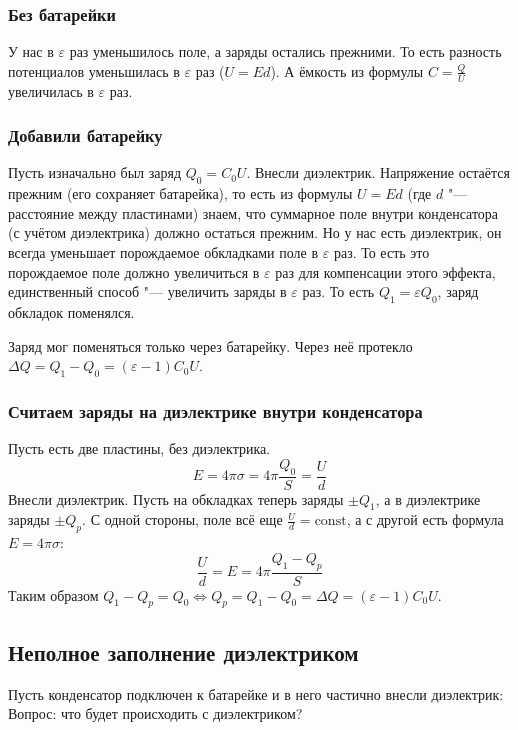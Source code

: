     \subsubsection{Без батарейки}
      У нас в $\varepsilon$ раз уменьшилось поле, а заряды остались прежними.
      То есть разность потенциалов уменьшилась в $\varepsilon$ раз ($U=Ed$).
      А ёмкость из формулы $C=\frac{Q}{U}$ увеличилась в $\varepsilon$ раз.

    \subsubsection{Добавили батарейку}
      Пусть изначально был заряд $Q_0=C_0U$.
      Внесли диэлектрик.
      Напряжение остаётся прежним (его сохраняет батарейка), то есть из формулы $U=Ed$ (где $d$ "--- расстояние между пластинами)
      знаем, что суммарное поле внутри конденсатора (с учётом диэлектрика) должно остаться прежним.
      Но у нас есть диэлектрик, он всегда уменьшает порождаемое обкладками поле в $\varepsilon$ раз.
      То есть это порождаемое поле должно увеличиться в $\varepsilon$ раз для компенсации этого эффекта,
      единственный способ "--- увеличить заряды в $\varepsilon$ раз.
      То есть $Q_1=\varepsilon Q_0$, заряд обкладок поменялся.
      \begin{Rem}
        Заряд мог поменяться только через батарейку.
        Через неё протекло $\Delta Q = Q_1 - Q_0 = (\varepsilon - 1)C_0U$.
      \end{Rem}

    \subsubsection{Считаем заряды на диэлектрике внутри конденсатора}
      Пусть есть две пластины, без диэлектрика.
      \[ E = 4\pi \sigma = 4\pi \frac{Q_0}S = \frac U d\]
      Внесли диэлектрик.
      Пусть на обкладках теперь заряды $\pm Q_1$, а в диэлектрике заряды $\pm Q_p$.
      С одной стороны, поле всё еще $\frac U d = \mathrm{const}$, а с другой есть формула $E = 4\pi \sigma$:
      \[ \frac U d = E = 4\pi \frac{Q_1-Q_p}{S}\]
      Таким образом $Q_1-Q_p=Q_0 \iff Q_p=Q_1-Q_0=\Delta Q = (\varepsilon-1)C_0U$.

  \subsection{Неполное заполнение диэлектриком}
    Пусть конденсатор подключен к батарейке и в него частично внесли диэлектрик:
    Вопрос: что будет происходить с диэлектриком?


